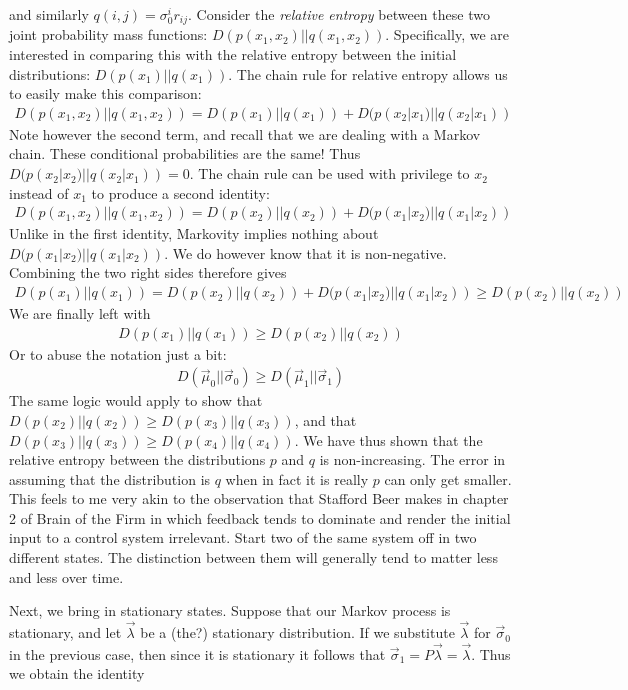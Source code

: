 and similarly $q(i,j) = \sigma_0^ir_{ij}$. Consider the \emph{relative entropy} between these two joint probability mass functions: $D(p(x_1,x_2)||q(x_1,x_2))$. Specifically, we are interested in comparing this with the relative entropy between the initial distributions: $D(p(x_1)||q(x_1))$. The chain rule for relative entropy allows us to easily make this comparison:
\begin{align}
	D(p(x_1,x_2)||q(x_1,x_2)) = D(p(x_1)||q(x_1)) + D(p(x_2|x_1)||q(x_2|x_1))	
\end{align}
Note however the second term, and recall that we are dealing with a Markov chain. These conditional probabilities are the same! Thus $D(p(x_2|x_2)||q(x_2|x_1)) = 0$. The chain rule can be used with privilege to $x_2$ instead of $x_1$ to produce a second identity:
\begin{align}
	D(p(x_1,x_2)||q(x_1,x_2)) = D(p(x_2)||q(x_2)) + D(p(x_1|x_2)||q(x_1|x_2))	
\end{align}
Unlike in the first identity, Markovity implies nothing about $D(p(x_1|x_2)||q(x_1|x_2))$. We do however know that it is non-negative. Combining the two right sides therefore gives  
\begin{align}
	D(p(x_1)||q(x_1)) = D(p(x_2)||q(x_2))+D(p(x_1|x_2)||q(x_1|x_2)) \geq D(p(x_2)||q(x_2))
\end{align}
We are finally left with 
\begin{align}
	D(p(x_1)||q(x_1)) \geq D(p(x_2)||q(x_2))
\end{align}
Or to abuse the notation just a bit:
\begin{align}
	D(\vec{\mu}_0||\vec{\sigma}_0) \geq D(\vec{\mu}_1||\vec{\sigma}_1)
\end{align}
The same logic would apply to show that $D(p(x_2)||q(x_2)) \geq D(p(x_3)||q(x_3))$, and that $D(p(x_3)||q(x_3)) \geq D(p(x_4)||q(x_4))$. We have thus shown that the relative entropy between the distributions $p$ and $q$ is non-increasing. The error in assuming that the distribution is $q$ when in fact it is really $p$ can only get smaller. This feels to me very akin to the observation that Stafford Beer makes in chapter 2 of Brain of the Firm in which feedback tends to dominate and render the initial input to a control system irrelevant. Start two of the same system off in two different states. The distinction between them will generally tend to matter less and less over time. \par 
Next, we bring in stationary states. Suppose that our Markov process is stationary, and let $\vec{\lambda}$ be a (the?) stationary distribution. If we substitute $\vec{\lambda}$ for $\vec{\sigma}_0$ in the previous case, then since it is stationary it follows that $\vec{\sigma}_1 = P\vec{\lambda} = \vec{\lambda}$. Thus we obtain the identity
